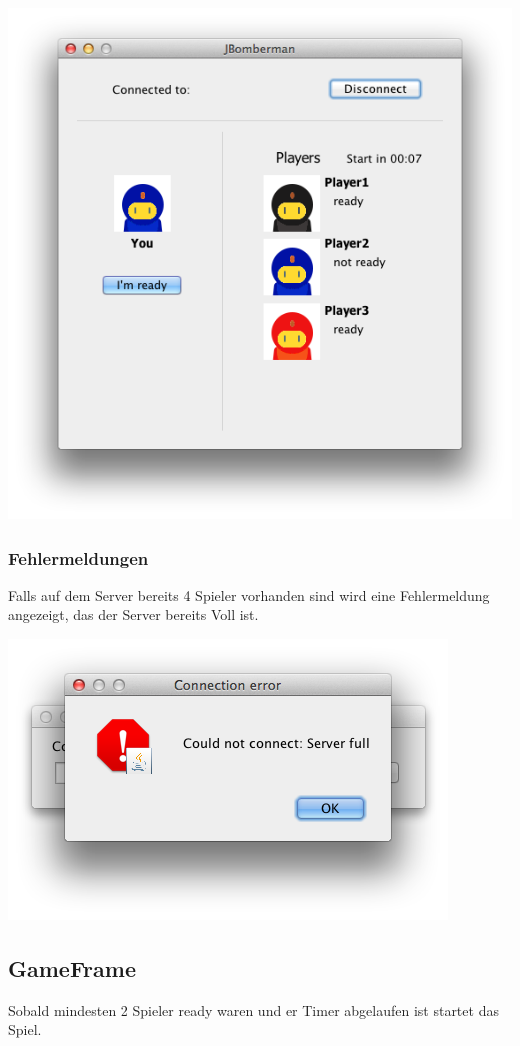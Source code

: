 \documentclass[11pt]{scrartcl}
\begin{document}
\includegraphics[scale=0.45]{LobbyTimer}

\subsubsection{Fehlermeldungen}
Falls auf dem Server bereits 4 Spieler vorhanden sind wird eine Fehlermeldung 
angezeigt, das der Server bereits Voll ist.

\includegraphics[scale=0.45]{ErrorServerFull}
\newpage
\subsection{GameFrame}
Sobald mindesten 2 Spieler ready waren und er Timer abgelaufen ist startet das 
Spiel.
\end{document}
